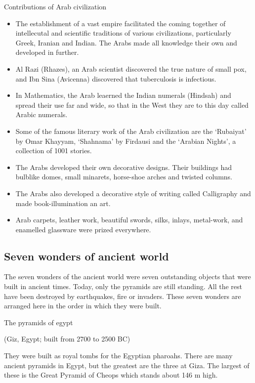 \documentclass[
  openany]{book}
\providecommand{\tightlist}{%
  \setlength{\itemsep}{0pt}\setlength{\parskip}{0pt}}
\begin{document}
Contributions of Arab civilization

\begin{itemize}
\tightlist
\item
  The establishment of a vast empire facilitated the coming together of intellecutal and scientific traditions of various civilizations, particularly Greek, Iranian and Indian. The Arabs made all knowledge their own and developed in further.
\item
  Al Razi (Rhazes), an Arab scientist discovered the true nature of small pox, and Ibn Sina (Avicenna) discovered that tuberculosis is infectious.
\item
  In Mathematics, the Arab leaerned the Indian numerals (Hindsah) and spread their use far and wide, so that in the West they are to this day called Arabic numerals.
\item
  Some of the famous literary work of the Arab civilization are the `Rubaiyat' by Omar Khayyam, `Shahnama' by Firdausi and the `Arabian Nights', a collection of 1001 stories.
\item
  The Arabs developed their own decorative designs. Their buildings had bulblike domes, small minarets, horse-shoe arches and twisted columns.
\item
  The Arabs also developed a decorative style of writing called Calligraphy and made book-illumination an art.
\item
  Arab carpets, leather work, beautiful swords, silks, inlays, metal-work, and enamelled glassware were prized everywhere.
\end{itemize}

\hypertarget{seven-wonders-of-ancient-world}{%
\subsection{Seven wonders of ancient world}\label{seven-wonders-of-ancient-world}}

The seven wonders of the ancient world were seven outstanding objects that were built in ancient times. Today, only the pyramids are still standing. All the rest have been destroyed by earthquakes, fire or invaders. These seven wonders are arranged here in the order in which they were built.

The pyramids of egypt

(Giz, Egypt; built from 2700 to 2500 BC)

They were built as royal tombs for the Egyptian pharoahs. There are many ancient pyramids in Egypt, but the greatest are the three at Giza. The largest of these is the Great Pyramid of Cheops which stands about 146 m high.
\end{document}
